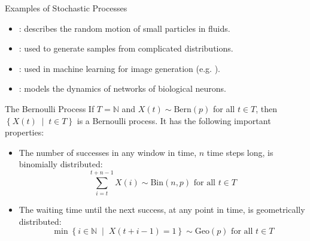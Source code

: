\documentclass[10pt]{beamer}
\begin{document}
\begin{frame}[fragile]{Examples of Stochastic Processes}
\begin{itemize}[<+->]
    \item \href{https://en.wikipedia.org/wiki/Brownian_motion}{\color{mLightBrown}{Brownian motion}}: describes the random motion of small particles in fluids.
    \item \href{https://en.wikipedia.org/wiki/Markov_chain_Monte_Carlo}{\color{mLightBrown}{Markov chain Monte Carlo}}: used to generate samples from complicated distributions.
    \item \href{https://en.wikipedia.org/wiki/Diffusion_process}{\color{mLightBrown}{Diffusion processes}}: used in machine learning for image generation (e.g. \href{https://en.wikipedia.org/wiki/Stable_Diffusion}{\color{mLightBrown}{Stable Diffusion}}).
    \item \href{https://en.wikipedia.org/wiki/Galves%E2%80%93L%C3%B6cherbach_model}{\color{mLightBrown}{Galves–L\"ocherbach model}}: models the dynamics of networks of biological neurons.
\end{itemize}
\end{frame}

\begin{frame}[fragile]{The Bernoulli Process}
If \(T = \mathbb{N}\) and \(X\left(t\right) \sim \textrm{Bern}\left(p\right)\) for all \(t \in T\), then \(\left\{X\left(t\right) \;\middle|\; t \in T\right\}\) is a Bernoulli process. It has the following important properties:
\begin{itemize}[<+->]
    \item The number of successes in any window in time, \(n\) time steps long, is binomially distributed:
    \begin{equation*}
        \sum_{i = t}^{t + n - 1} X\left(i\right) \sim \textrm{Bin}\left(n, p\right) \textrm{ for all } t \in T
    \end{equation*}
    \item The waiting time until the next success, at any point in time, is geometrically distributed:
    \begin{equation*}
        \min\left\{i \in \mathbb{N} \;\middle|\; X\left(t + i - 1\right) = 1\right\} \sim \textrm{Geo}\left(p\right) \textrm{ for all } t \in T
    \end{equation*}
\end{itemize}
\end{frame}
\end{document}
